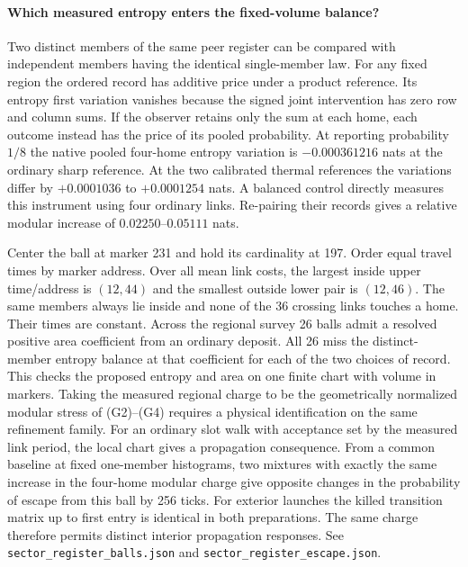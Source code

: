 \documentclass[11pt]{article}
\begin{document}
\paragraph{Which measured entropy enters the fixed-volume balance?}
Two distinct members of the same peer register can be compared with
independent members having the identical single-member law. For any
fixed region the ordered record has additive price under a product
reference. Its entropy first variation vanishes because the signed
joint intervention has zero row and column sums. If the observer
retains only the sum at each home, each outcome instead has the
price of its pooled probability. At reporting probability \(1/8\)
the native pooled four-home entropy variation is \(-0.000361216\)
nats at the ordinary sharp reference. At the two calibrated thermal
references the variations differ by \(+0.0001036\) to
\(+0.0001254\) nats. A balanced control directly measures this
instrument using four ordinary links. Re-pairing their records gives
a relative modular increase of \(0.02250\)--\(0.05111\) nats.

Center the ball at marker 231 and hold its cardinality at 197.
Order equal travel times by marker address. Over all mean link costs,
the largest inside upper time/address is \((12,44)\) and the smallest
outside lower pair is \((12,46)\). The same members always lie inside
and none of the 36 crossing links touches a home. Their times are
constant. Across the regional survey 26 balls admit a resolved positive
area coefficient from an ordinary deposit. All 26 miss the
distinct-member entropy balance at that coefficient for each of the
two choices of record. This checks the proposed entropy and area on
one finite chart with volume in markers. Taking the measured regional
charge to be the geometrically normalized modular stress of (G2)--(G4)
requires a physical identification on the same refinement family.
For an ordinary slot walk with acceptance set by the measured link
period, the local chart gives a propagation consequence. From a
common baseline at fixed one-member histograms, two mixtures with
exactly the same increase in the four-home modular charge give
opposite changes in the probability of escape from this ball by
256 ticks. For exterior launches the killed transition matrix up
to first entry is identical in both preparations. The same charge
therefore permits distinct interior propagation responses. See
\texttt{sector\_register\_balls.json} and
\texttt{sector\_register\_escape.json}.
\end{document}
